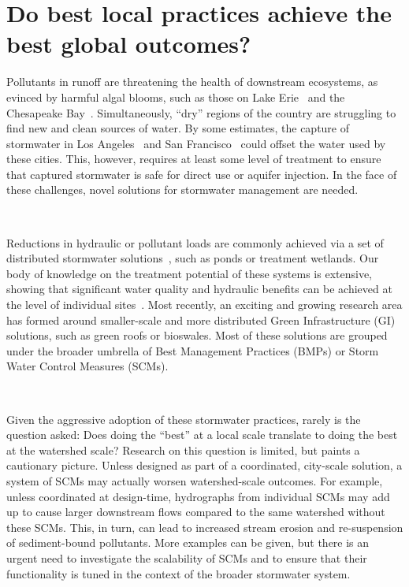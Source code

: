 \section{Do best local practices achieve the best global outcomes?}

Pollutants in runoff are threatening the health of downstream ecosystems, as evinced by harmful algal blooms, such as those on Lake Erie~\cite{Michalak2013Record-settingConditions} and the Chesapeake Bay~\cite{powledge2005chesapeake,Boesch2001ChesapeakeAgriculture}.
Simultaneously, ``dry'' regions of the country are struggling to find new and clean sources of water.
By some estimates, the capture of stormwater in Los Angeles~\cite{Geosyntec2014} and San Francisco~\cite{Garrison2014StormwaterCalifornia} could offset the water used by these cities.
This, however, requires at least some level of treatment to ensure that captured stormwater is safe for direct use or aquifer injection.
In the face of these challenges, novel solutions for stormwater management are needed.

\

Reductions in hydraulic or pollutant loads are commonly achieved via a set of distributed stormwater solutions~\cite{Hamel2013Source-controlReview, Burns2012HydrologicReform}, such as ponds or treatment wetlands.
Our body of knowledge on the treatment potential of these systems is extensive, showing that significant water quality and hydraulic benefits can be achieved at the level of individual sites~\cite{Stanley1996PollutantPond,Carleton2000PerformanceRunoff}.
Most recently, an exciting and growing research area has formed around smaller-scale and more distributed Green Infrastructure (GI) solutions, such as green roofs or bioswales\cite{Benedict2006GreenCentury}.
Most of these solutions are grouped under the broader umbrella of Best Management Practices\cite{Urbonas1994ASSESSMENTTECHNOLOGY} (BMPs) or Storm Water Control Measures (SCMs)\cite{Cizek201340}.

\

Given the aggressive adoption of these stormwater practices, rarely is the question asked: Does doing the ``best'' at a local scale translate to doing the best at the watershed scale? Research on this question is limited\cite{Petrucci2013DoOutcomes,Sage2015StormwaterPractices,Petrucci2014UrbanHow}, but paints a cautionary picture.
Unless designed as part of a coordinated, city-scale solution, a system of SCMs may actually worsen watershed-scale outcomes.
For example, unless coordinated at design-time, hydrographs from individual SCMs
may add up to cause larger downstream flows compared to the same watershed
without these SCMs\cite{Emerson2005Watershed-ScaleBasins}.
This, in turn, can lead to increased stream erosion and re-suspension of sediment-bound pollutants.
More examples can be given, but there is an urgent need to investigate the
scalability of SCMs and to ensure that their functionality is tuned in the context of the broader stormwater system. 

